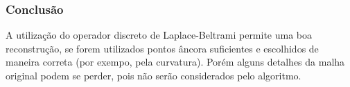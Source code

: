 \begin{frame}
\frametitle{Conclusão}

A utilização do operador discreto de Laplace-Beltrami permite uma boa reconstrução, se forem utilizados pontos âncora suficientes e escolhidos de maneira correta (por exempo, pela curvatura). Porém alguns detalhes da malha original podem se perder, pois não serão considerados pelo algoritmo.

\end{frame}


